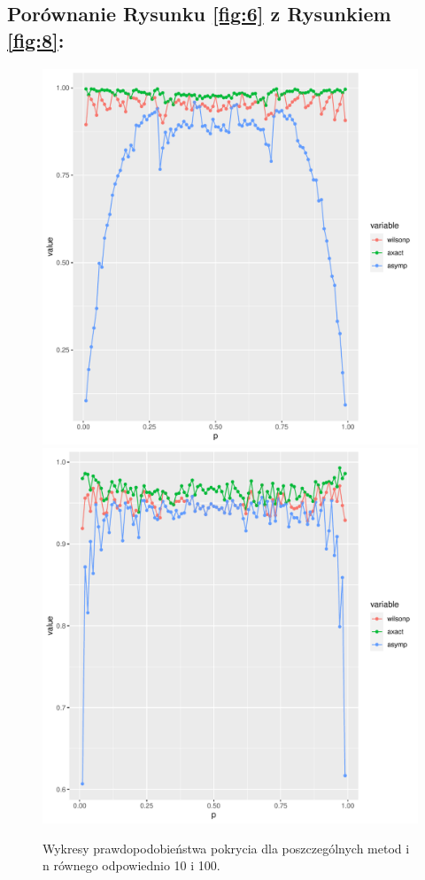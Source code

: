\documentclass[12pt]{mwart}\usepackage[]{graphicx}\usepackage[]{color}
\newenvironment{knitrout}{}{} %
\begin{document}
\subsection*{Porównanie Rysunku \ref{fig:6} z Rysunkiem \ref{fig:8}:} 
\begin{knitrout}
\color{fgcolor}\begin{figure}[H]
\includegraphics[width=0.5\linewidth]{figure/fig_10-1} 
\includegraphics[width=0.5\linewidth]{figure/fig_10-2} \caption{\label{fig:10}Wykresy prawdopodobieństwa pokrycia dla poszczególnych metod i n równego odpowiednio 10 i 100.}\label{fig:fig_10}
\end{figure}

\end{knitrout}
\newpage
\end{document}
